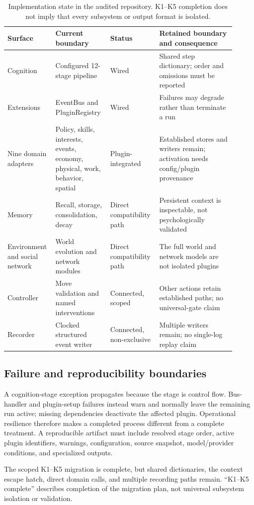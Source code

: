 \begin{table}[t]
\centering
\small
\setlength{\tabcolsep}{4pt}
\begin{tabular}{@{}p{0.17\linewidth}p{0.23\linewidth}p{0.19\linewidth}p{0.32\linewidth}@{}}
\toprule
Surface & Current boundary & Status & Retained boundary and consequence \\
\midrule
Cognition & Configured 12-stage pipeline & Wired & Shared step dictionary; order and omissions must be reported \\
Extensions & EventBus and PluginRegistry & Wired & Failures may degrade rather than terminate a run \\
Nine domain adapters & Policy, skills, interests, events, economy, physical, work, behavior, spatial & Plugin-integrated & Established stores and writers remain; activation needs config/plugin provenance \\
Memory & Recall, storage, consolidation, decay & Direct compatibility path & Persistent context is inspectable, not psychologically validated \\
Environment and social network & World evolution and network modules & Direct compatibility path & The full world and network models are not isolated plugins \\
Controller & Move validation and named interventions & Connected, scoped & Other actions retain established paths; no universal-gate claim \\
Recorder & Clocked structured event writer & Connected, non-exclusive & Multiple writers remain; no single-log replay claim \\
\bottomrule
\end{tabular}
\caption{Implementation state in the audited repository.  K1--K5 completion
does not imply that every subsystem or output format is isolated.}
\label{tab:migration-state}
\end{table}

\subsection{Failure and reproducibility boundaries}

A cognition-stage exception propagates because the stage is control flow.
Bus-handler and plugin-setup failures instead warn and normally leave the
remaining run active; missing dependencies deactivate the affected plugin.
Operational resilience therefore makes a completed process different from a
complete treatment.  A reproducible artifact must include resolved stage
order, active plugin identifiers, warnings, configuration, source snapshot,
model/provider conditions, and specialized outputs.

The scoped K1--K5 migration is complete, but shared dictionaries, the context
escape hatch, direct domain calls, and multiple recording paths remain.
``K1--K5 complete'' describes completion of the migration plan, not universal
subsystem isolation or validation.

